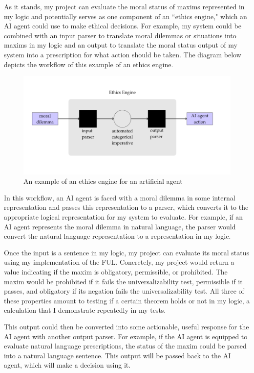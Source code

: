 \begin{isabellebody}
\begin{isamarkuptext}
As it stands, my project can evaluate the moral status of maxims represented in my logic and potentially 
serves as one component of an ``ethics engine," which an AI agent could use to make ethical decisions.
For example, my system could be combined with an input parser to translate moral dilemmas or situations into maxims in my logic and an output 
to translate the moral status output of my system into a prescription for what action should be taken.
The diagram below depicts the workflow of this example of an ethics engine.%
\end{isamarkuptext}\isamarkuptrue%
%
\begin{figure}
\centering
\includegraphics[scale=0.4]{AI_engine.png}
\caption{An example of an ethics engine for an artificial agent} \label{fig:1}
\end{figure}
%
\begin{isamarkuptext}%
In this workflow, an AI agent is faced with a moral dilemma in some internal representation and 
passes this representation to a parser, which converts it to the appropriate logical representation 
for my system to evaluate. For example, if an AI agent represents the moral dilemma in natural language, 
the parser would convert the natural language representation to a representation in my logic.

Once the
input is a sentence in my logic, my project can evaluate its moral status using my implementation of 
the FUL. Concretely, my project would return a value indicating if the maxim is obligatory, permissible, 
or prohibited. The maxim would be prohibited if it fails the universalizability test, permissible if it passes, and obligatory 
if its negation fails the universalizability test. All three of these properties amount to testing if a 
certain theorem holds or not in my logic, a calculation that I demonstrate repeatedly in my tests. 

This output could then be converted into some actionable, useful response for the AI agent with another 
output parser. For example, if the AI agent is equipped to evaluate natural language prescriptions, the 
status of the maxim could be parsed into a natural language sentence. This output will be passed back 
to the AI agent, which will make a decision using it.


\end{isamarkuptext}
\end{isabellebody}

